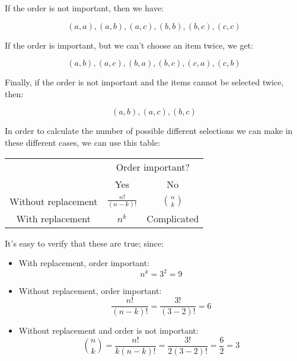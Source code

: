 If the order is not important, then we have:

\begin{dmath*}
	(a,a), (a,b), (a,c), (b,b), (b,c), (c,c)
\end{dmath*}

If the order is important, but we can't choose an item twice, we get:

\begin{dmath*}
	(a,b), (a,c), (b,a), (b,c), (c,a), (c,b)
\end{dmath*}

Finally, if the order is not important and the items cannot be selected twice,
then:

\begin{dmath*}
	(a,b), (a,c), (b,c)
\end{dmath*}

In order to calculate the number of possible different selections we can make in
these different cases, we can use this table:

\begin{center}
\begin{tabular}{|c|c|c|}
	\hline
	& \multicolumn{2}{c|}{Order important?}\\
	\cline{2-3}
	& Yes & No\\ \hline
	Without replacement & $\frac{n!}{(n-k)!}$ & $n \choose k$\\ \hline
	With replacement & $n^k$ & Complicated\\ \hline
\end{tabular}
\end{center}

It's easy to verify that these are true; since:

\begin{itemize}
	\item With replacement, order important:
	\begin{dmath*}
		n^k = 3^2 = 9
	\end{dmath*}
	\item Without replacement, order important:
	\begin{dmath*}
		\frac{n!}{(n - k)!} = 	\frac{3!}{(3 - 2)!} = 6
	\end{dmath*}
	\item Without replacement and order is not important:
	\begin{dmath*}
		{n \choose k} = \frac{n!}{k(n - k)!} = \frac{3!}{2(3 - 2)!} = \frac{6}{2} = 3
	\end{dmath*}

\end{itemize}

